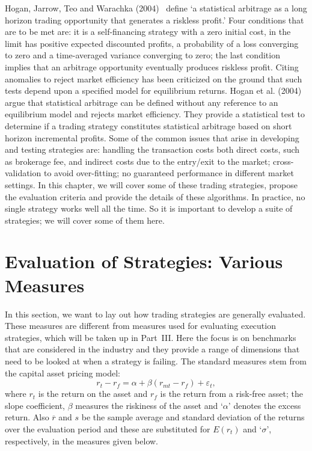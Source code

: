 Hogan, Jarrow, Teo and Warachka (2004)~\cite{Hogan} define `a statistical arbitrage as a long horizon trading opportunity that generates a riskless profit.' Four conditions that are to be met are: it is a self-financing strategy with a zero initial cost, in the limit has positive expected discounted profits, a probability of a loss converging to zero and a time-averaged variance converging to zero; the last condition implies that an arbitrage opportunity eventually produces riskless profit. Citing anomalies to reject  market efficiency has been criticized on the ground that such tests depend upon a specified model for equilibrium returns. Hogan et al. (2004)~\cite{Hogan} argue that statistical arbitrage can be defined without any reference to an equilibrium model and rejects market efficiency. They provide a statistical test to determine if a trading strategy constitutes statistical arbitrage based on short horizon incremental profits. Some of the common issues that arise in developing and testing strategies are: handling the transaction costs both direct costs, such as brokerage fee, and indirect costs due to the entry/exit to the market; cross-validation to avoid over-fitting; no guaranteed performance in different market settings. In this chapter, we will cover some of these trading strategies, propose the evaluation criteria and provide the details of these algorithms. In practice, no single strategy works well all the time. So it is important to develop a suite of strategies; we will cover some of them here.



\section{Evaluation of Strategies: Various Measures\label{sec:various_measures}}

In this section, we want to lay out how trading strategies are generally evaluated. These measures are different from measures used for evaluating execution strategies, which will be taken up in Part~III. Here the focus is on benchmarks that are considered in the industry and they provide a range of dimensions that need to be looked at when a strategy is failing. The standard measures stem from the capital asset pricing model:
	\begin{equation} \label{eqn:rt_minus_rf_is}
	r_{t} - r_f = \alpha + \beta (r_{mt} - r_f) + \varepsilon_{t},
	\end{equation}
where $r_t$ is the return on the asset and $r_f$ is the return from a risk-free asset; the slope coefficient, $\beta$ measures the riskiness of the asset and `$\alpha$' denotes the excess return. Also $\overline{r}$ and $s$ be the sample average and standard deviation of the returns over the evaluation period and these are substituted for $E(r_t)$ and `$\sigma$', respectively, in the measures given below.\label{in:benchmark}

